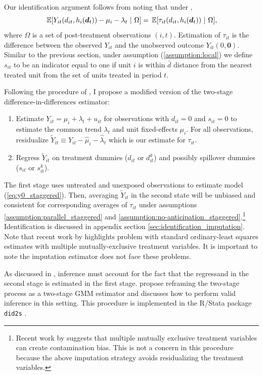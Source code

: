 Our identification argument follows from noting that under ,
$$
  \expec{Y_{it}(d_{it}, h_i(\bm{d}_t)) - \mu_i - \lambda_t \ | \ \Omega} = \expec{\tau_{it}(d_{it}, h_i(\bm{d}_t)) \ | \ \Omega},
$$
where $\Omega$ is a set of post-treatment observations $(i, t)$. Estimation of $\tau_{it}$ is the difference between the observed $Y_{it}$ and the unobserved outcome $Y_{it}(0, \bm{0})$. Similar to the previous section, under assumption (\ref{assumption:local}) we define $s_{it}$ to be an indicator equal to one if unit $i$ is within $\bar{d}$ distance from the nearest treated unit from the set of units treated in period $t$.

Following the procedure of \citet{Gardner_2021,Borusyak_Jaravel_Spiess_2021}, I propose a modified version of the two-stage difference-in-differences estimator: 
\begin{enumerate}
  \item Estimate $Y_{it} = \mu_i + \lambda_t + u_{it}$ for observations with $d_{it} = 0$ and $s_{it} = 0$ to estimate the common trend $\lambda_t$ and unit fixed-effects $\mu_i$. For all observations, residualize $\tilde{Y}_{it} \equiv Y_{it} - \hat{\mu}_i  - \hat{\lambda}_t$ which is our estimate for $\tau_{it}$.
  
  \item Regress $\tilde{Y}_{it}$ on treatment dummies ($d_{it}$ or $d_{it}^k$) and possibly spillover dummies ($s_{it}$ or $s_{it}^k$).
\end{enumerate}

The first stage uses untreated and unexposed observations to estimate model (\ref{eq:y0_staggered}). Then, averaging $\tilde{Y}_{it}$ in the second state will be unbiased and consistent for corresponding averages of $\tau_{it}$ under assumptions \ref{assumption:parallel_staggered} and \ref{assumption:no-anticipation_staggered}.\footnote{Recent work by \citet{goldsmith2022contamination} suggests that multiple mutually exclusive treatment variables can create contamination bias. This is not a concern in this procedure because the above imputation strategy avoids residualizing the treatment variables.} Identification is discussed in appendix section \ref{sec:identification_imputation}. Note that recent work by \citet{goldsmith2022contamination} highlights problem with standard ordinary-least squares estimates with multiple mutually-exclusive treatment variables. It is important to note the imputation estimator does not face these problems. 

As discussed in \citet{Gardner_2021}, inference must account for the fact that the regressand in the second stage is estimated in the first stage. \citet{Gardner_2021} propose reframing the two-stage process as a two-stage GMM estimator and discusses how to perform valid inference in this setting. This procedure is implemented in the R/Stata package \texttt{did2s} \citep{did2s}.  



